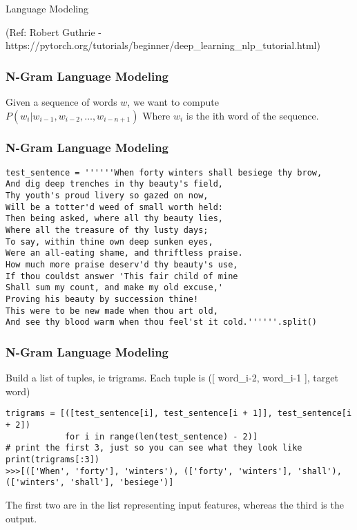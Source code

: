  
\begin{frame}[fragile]\frametitle{}

\begin{center}
{\Large  Language Modeling}

(Ref:  Robert Guthrie -  https://pytorch.org/tutorials/beginner/deep\_learning\_nlp\_tutorial.html)
\end{center}
\end{frame}


\begin{frame}[fragile]
\frametitle{N-Gram Language Modeling}

Given a sequence of words $w$, we want to compute $P(w_i | w_{i-1}, w_{i-2}, \dots, w_{i-n+1} )$ Where $w_i$ is the ith word of the sequence.
         
\end{frame} 


\begin{frame}[fragile]
\frametitle{N-Gram Language Modeling}
 \begin{lstlisting}
test_sentence = ''''''When forty winters shall besiege thy brow,
And dig deep trenches in thy beauty's field,
Thy youth's proud livery so gazed on now,
Will be a totter'd weed of small worth held:
Then being asked, where all thy beauty lies,
Where all the treasure of thy lusty days;
To say, within thine own deep sunken eyes,
Were an all-eating shame, and thriftless praise.
How much more praise deserv'd thy beauty's use,
If thou couldst answer 'This fair child of mine
Shall sum my count, and make my old excuse,'
Proving his beauty by succession thine!
This were to be new made when thou art old,
And see thy blood warm when thou feel'st it cold.''''''.split()
\end{lstlisting}           
\end{frame} 

\begin{frame}[fragile]
\frametitle{N-Gram Language Modeling}
Build a list of tuples, ie trigrams.  Each tuple is ([ word\_i-2, word\_i-1 ], target word)
 \begin{lstlisting}
trigrams = [([test_sentence[i], test_sentence[i + 1]], test_sentence[i + 2])
            for i in range(len(test_sentence) - 2)]
# print the first 3, just so you can see what they look like
print(trigrams[:3])
>>>[(['When', 'forty'], 'winters'), (['forty', 'winters'], 'shall'), (['winters', 'shall'], 'besiege')]
\end{lstlisting}          
The first two are in the list representing input features, whereas the third is the output. 
\end{frame} 

